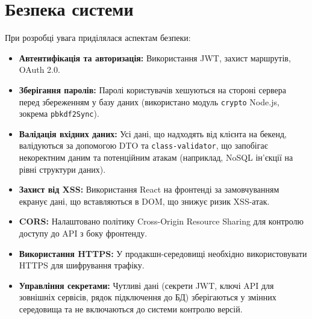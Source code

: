 \section{Безпека системи}
\label{sec:security_considerations}
При розробці увага приділялася аспектам безпеки:
\begin{itemize}
    \item \textbf{Автентифікація та авторизація:} Використання JWT, захист маршрутів, OAuth 2.0.
    \item \textbf{Зберігання паролів:} Паролі користувачів хешуються на стороні сервера перед збереженням у базу даних (використано модуль \texttt{crypto} Node.js, зокрема \texttt{pbkdf2Sync}).
    \item \textbf{Валідація вхідних даних:} Усі дані, що надходять від клієнта на бекенд, валідуються за допомогою DTO та \texttt{class-validator}, що запобігає некоректним даним та потенційним атакам (наприклад, NoSQL ін'єкції на рівні структури даних).
    \item \textbf{Захист від XSS:} Використання React на фронтенді за замовчуванням екранує дані, що вставляються в DOM, що знижує ризик XSS-атак.
    \item \textbf{CORS:} Налаштовано політику Cross-Origin Resource Sharing для контролю доступу до API з боку фронтенду.
    \item \textbf{Використання HTTPS:} У продакшн-середовищі необхідно використовувати HTTPS для шифрування трафіку.
    \item \textbf{Управління секретами:} Чутливі дані (секрети JWT, ключі API для зовнішніх сервісів, рядок підключення до БД) зберігаються у змінних середовища та не включаються до системи контролю версій.
\end{itemize} 